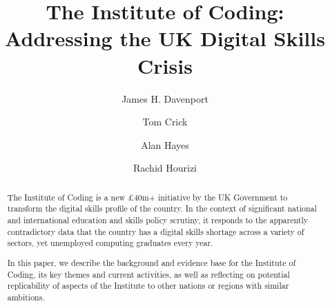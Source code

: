 \documentclass[sigconf]{acmart}
\begin{document}
\title{The Institute of Coding: Addressing the UK Digital Skills Crisis}
\author{James H. Davenport}

\author{Tom Crick}

\author{Alan Hayes}
\author{Rachid Hourizi}
 

\renewcommand{\shortauthors}{Davenport, Crick, Hayes and Hourizi}


\begin{abstract}
The Institute of Coding is a new \pounds40m+ initiative by the UK
Government to transform the digital skills profile of the country. In
the context of significant national and international education and
skills policy scrutiny, it responds to the apparently contradictory
data that the country has a digital skills shortage across a variety
of sectors, yet unemployed computing graduates every year.
	


In this paper, we describe the background and evidence base for the
Institute of Coding, its key themes and current activities, as
well as reflecting on potential replicability of aspects of the
Institute to other nations or regions with similar ambitions.
\end{abstract}
\end{document}
